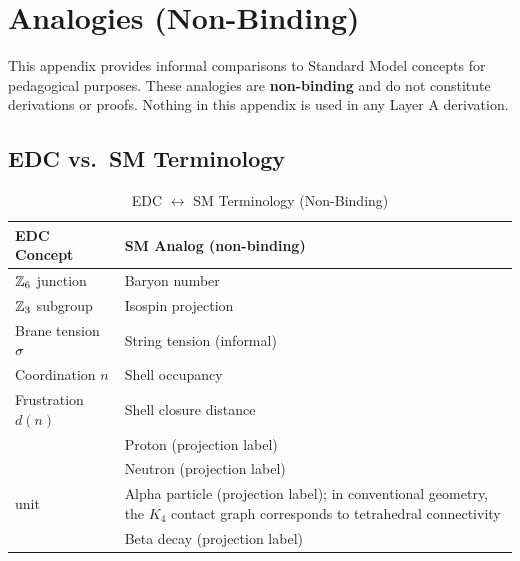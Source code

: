 
\chapter{Analogies (Non-Binding)}
\label{app:analogies}

\begin{tcolorbox}[colback=orange!5,colframe=orange!70!black,title=Disclaimer]
This appendix provides informal comparisons to Standard Model concepts for pedagogical
purposes. These analogies are \textbf{non-binding} and do not constitute derivations
or proofs. Nothing in this appendix is used in any Layer A derivation.
\end{tcolorbox}

\section{EDC vs.\ SM Terminology}
\label{sec:x:terminology}

\begin{table}[htbp]
\centering
\caption{EDC $\leftrightarrow$ SM Terminology (Non-Binding)}
\label{tab:x:terminology}
\begin{tabular}{ll}
    \toprule
    EDC Concept & SM Analog (non-binding) \\
    \midrule
    $\mathbb{Z}_6$ junction & Baryon number \\
    $\mathbb{Z}_3$ subgroup & Isospin projection \\
    Brane tension $\sigma$ & String tension (informal) \\
    Coordination $n$ & Shell occupancy \\
    Frustration $d(n)$ & Shell closure distance \\
    \AnchorJunction{} & Proton (projection label) \\
    \MetastableJunction{} & Neutron (projection label) \\
    \ClosedFour{} unit & Alpha particle (projection label); in conventional
        geometry, the $K_4$ contact graph corresponds to tetrahedral connectivity \\
    \JunctionTransition{} & Beta decay (projection label) \\
    \bottomrule
\end{tabular}
\end{table}


